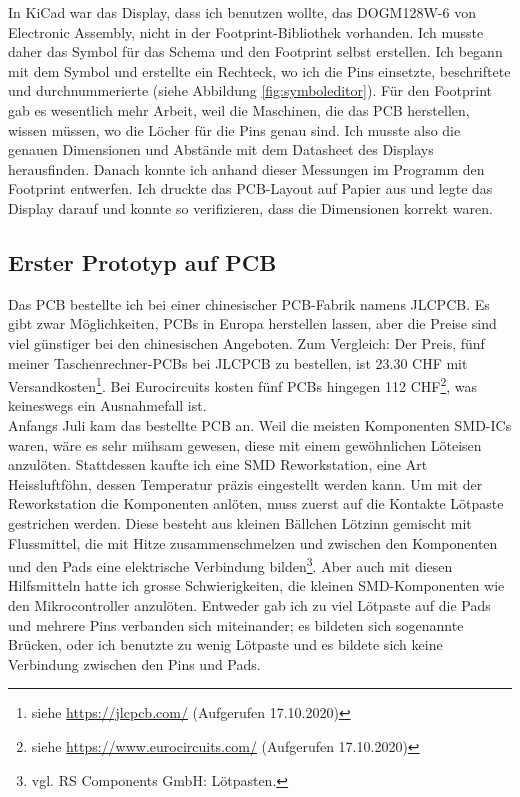 \documentclass[12pt, a4paper]{report}
\begin{document}
In KiCad war das Display, dass ich benutzen wollte, das DOGM128W-6 von Electronic Assembly, nicht in der Footprint-Bibliothek vorhanden. Ich musste daher das Symbol für das Schema und den Footprint selbst erstellen. Ich begann mit dem Symbol und erstellte ein Rechteck, wo ich die Pins einsetzte, beschriftete und durchnummerierte (siehe Abbildung \ref{fig:symboleditor}). Für den Footprint gab es wesentlich mehr Arbeit, weil die Maschinen, die das PCB herstellen, wissen müssen, wo die Löcher für die Pins genau sind. Ich musste also die genauen Dimensionen und Abstände mit dem Datasheet des Displays herausfinden. Danach konnte ich anhand dieser Messungen im Programm den Footprint entwerfen. Ich druckte das PCB-Layout auf Papier aus und legte das Display darauf und konnte so verifizieren, dass die Dimensionen korrekt waren.
\subsection{Erster Prototyp auf PCB}
Das PCB bestellte ich bei einer chinesischer PCB-Fabrik namens JLCPCB. Es gibt zwar Möglichkeiten, PCBs in Europa herstellen lassen, aber die Preise sind viel günstiger bei den chinesischen Angeboten. Zum Vergleich: Der Preis, fünf meiner Taschenrechner-PCBs bei JLCPCB zu bestellen, ist 23.30 CHF mit Versandkosten\footnote{siehe \url{https://jlcpcb.com/} (Aufgerufen 17.10.2020)}. Bei Eurocircuits kosten fünf PCBs hingegen 112 CHF\footnote{siehe \url{https://www.eurocircuits.com/} (Aufgerufen 17.10.2020)}, was keineswegs ein Ausnahmefall ist.
\\[\medskipamount]
Anfangs Juli kam das bestellte PCB an. Weil die meisten Komponenten SMD-ICs waren, wäre es sehr mühsam gewesen, diese mit einem gewöhnlichen Löteisen anzulöten. Stattdessen kaufte ich eine SMD Reworkstation, eine Art Heissluftföhn, dessen Temperatur präzis eingestellt werden kann. Um mit der Reworkstation die Komponenten anlöten, muss zuerst auf die Kontakte Lötpaste gestrichen werden. Diese besteht aus kleinen Bällchen Lötzinn gemischt mit Flussmittel, die mit Hitze zusammenschmelzen und zwischen den Komponenten und den Pads eine elektrische Verbindung bilden\footnote{vgl. RS Components GmbH: Lötpasten.}. Aber auch mit diesen Hilfsmitteln hatte ich grosse Schwierigkeiten, die kleinen SMD-Komponenten wie den Mikrocontroller anzulöten. Entweder gab ich zu viel Lötpaste auf die Pads und mehrere Pins verbanden sich miteinander; es bildeten sich sogenannte Brücken, oder ich benutzte zu wenig Lötpaste und es bildete sich keine Verbindung zwischen den Pins und Pads.
\end{document}
